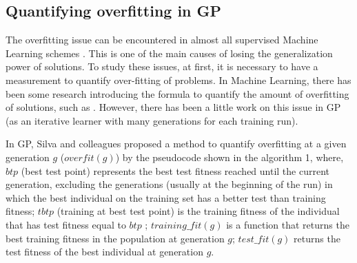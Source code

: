 \subsection {Quantifying overfitting in GP}
\label{Qua} 

The overfitting issue can be encountered in almost all supervised Machine Learning schemes \cite{1996Mitchell}. This is one of the main causes of losing the generalization power of solutions. To study these issues, at first, it is necessary to have a measurement to quantify over-fitting of problems. In Machine Learning, there has been some research introducing the formula to quantify the amount of overfitting of solutions, such as \cite{2008Trevor}\cite{Marcel}\cite{copas1983regression}\cite{bilger2015measuring}. However, there has been a little work on this issue in GP (as an iterative learner with many generations for each training run). \par

In GP, Silva and colleagues \cite{2010Vanneschi} proposed  a method to quantify overfitting at a given generation $g$ ($overfit(g)$) by the pseudocode shown in the algorithm 1, where, $btp$ (best test point) represents the best test fitness reached until the current generation, excluding the generations (usually at the beginning of the run) in which the best individual on the training set has a better test than training fitness; $tbtp$ (training at best test point) is the training fitness of the individual that has test fitness equal to $btp$ ; $training\_fit(g)$ is a function that returns the best training fitness in the population at generation $g$; $test\_fit(g)$ returns the test fitness of the best individual at generation $g$.

